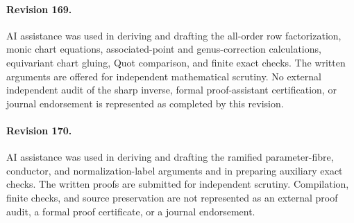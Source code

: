 \paragraph{Revision 169.}
AI assistance was used in deriving and drafting the all-order row
factorization, monic chart equations, associated-point and genus-correction
calculations, equivariant chart gluing, Quot comparison, and finite exact
checks. The written arguments are offered for independent mathematical
scrutiny. No external independent audit of the sharp inverse, formal
proof-assistant certification, or journal endorsement is represented as
completed by this revision.


\paragraph{Revision 170.}
AI assistance was used in deriving and drafting the ramified parameter-fibre,
conductor, and normalization-label arguments and in preparing auxiliary
exact checks. The written proofs are submitted for independent scrutiny.
Compilation, finite checks, and source preservation are not represented as
an external proof audit, a formal proof certificate, or a journal endorsement.

